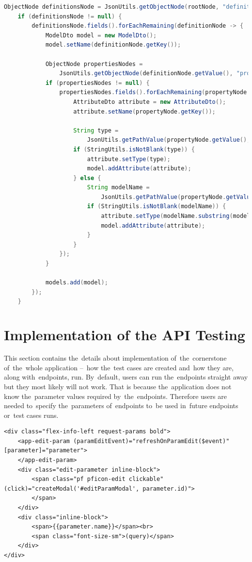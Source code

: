 \vspace{1mm}
\begin{lstlisting}[caption=Parsing the~API's model definitions from~the~Swagger's API file.,
style=dp-default, language=Java]
ObjectNode definitionsNode = JsonUtils.getObjectNode(rootNode, "definitions", false);
	if (definitionsNode != null) {
		definitionsNode.fields().forEachRemaining(definitionNode -> {
			ModelDto model = new ModelDto();
			model.setName(definitionNode.getKey());
                
			ObjectNode propertiesNodes = 
				JsonUtils.getObjectNode(definitionNode.getValue(), "properties", false);
			if (propertiesNodes != null) {
				propertiesNodes.fields().forEachRemaining(propertyNode -> {
					AttributeDto attribute = new AttributeDto();
                    attribute.setName(propertyNode.getKey());

                    String type = 
                    	JsonUtils.getPathValue(propertyNode.getValue(), "type", false);
                    if (StringUtils.isNotBlank(type)) {
                    	attribute.setType(type);
                        model.addAttribute(attribute);
                   	} else {
                    	String modelName = 
                    		JsonUtils.getPathValue(propertyNode.getValue(), "ref", false);
                        if (StringUtils.isNotBlank(modelName)) {
                        	attribute.setType(modelName.substring(modelName.lastIndexOf('/') + 1));
                           	model.addAttribute(attribute);
                        }
                    }
            	});
            }

            models.add(model);
    	});
	}
\end{lstlisting}

\section{Implementation of the API Testing}
This section contains the~details about implementation of~the~cornerstone of~the~whole application 
--~how the~test cases are created and~how they are, along with~endpoints, run. By~default, users can run
the~endpoints straight away but they most likely will not work. That is because the~application does not know
the~parameter values required by~the~endpoints. Therefore users are needed to~specify the~parameters of~endpoints
to~be used in~future endpoints or~test cases runs. 

\vspace{1mm}
\begin{lstlisting}[caption=Frontend's implementation of~setting the~parameter's value in~which\, all logic is handled by~the~matching
TypeScript file., style=dp-html]
<div class="flex-info-left request-params bold">
	<app-edit-param (paramEditEvent)="refreshOnParamEdit($event)" [parameter]="parameter">
	</app-edit-param>
	<div class="edit-parameter inline-block">
		<span class="pf pficon-edit clickable" (click)="createModal('#editParamModal', parameter.id)">
		</span>
	</div>
	<div class="inline-block">
		<span>{{parameter.name}}</span><br>
		<span class="font-size-sm">(query)</span>
	</div>
</div>
\end{lstlisting}

